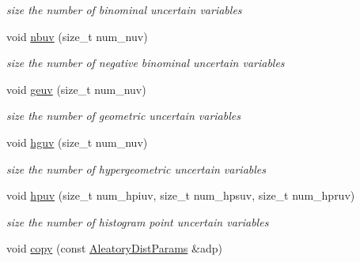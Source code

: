 \begin{DoxyCompactItemize}
\begin{DoxyCompactList}\small\item\em size the number of binominal uncertain variables \end{DoxyCompactList}\item 
void \hyperlink{classPecos_1_1AleatoryDistParams_a2e6e85b808e8753a51a3d06c83a0e4b3}{nbuv} (size\+\_\+t num\+\_\+nuv)\label{classPecos_1_1AleatoryDistParams_a2e6e85b808e8753a51a3d06c83a0e4b3}

\begin{DoxyCompactList}\small\item\em size the number of negative binominal uncertain variables \end{DoxyCompactList}\item 
void \hyperlink{classPecos_1_1AleatoryDistParams_a4e282d3372cfb8ac694ff3eed8fb6a4c}{geuv} (size\+\_\+t num\+\_\+nuv)\label{classPecos_1_1AleatoryDistParams_a4e282d3372cfb8ac694ff3eed8fb6a4c}

\begin{DoxyCompactList}\small\item\em size the number of geometric uncertain variables \end{DoxyCompactList}\item 
void \hyperlink{classPecos_1_1AleatoryDistParams_a96003513361e1ace5b53e7e8700863b5}{hguv} (size\+\_\+t num\+\_\+nuv)\label{classPecos_1_1AleatoryDistParams_a96003513361e1ace5b53e7e8700863b5}

\begin{DoxyCompactList}\small\item\em size the number of hypergeometric uncertain variables \end{DoxyCompactList}\item 
void \hyperlink{classPecos_1_1AleatoryDistParams_a6111651528c6d0f9638289d86dd9b561}{hpuv} (size\+\_\+t num\+\_\+hpiuv, size\+\_\+t num\+\_\+hpsuv, size\+\_\+t num\+\_\+hpruv)\label{classPecos_1_1AleatoryDistParams_a6111651528c6d0f9638289d86dd9b561}

\begin{DoxyCompactList}\small\item\em size the number of histogram point uncertain variables \end{DoxyCompactList}\item 
void \hyperlink{classPecos_1_1AleatoryDistParams_a3e97ad2dbb6fea6da3df33badfd9ad20}{copy} (const \hyperlink{classPecos_1_1AleatoryDistParams}{Aleatory\+Dist\+Params} \&adp)\label{classPecos_1_1AleatoryDistParams_a3e97ad2dbb6fea6da3df33badfd9ad20}


\end{DoxyCompactItemize}
